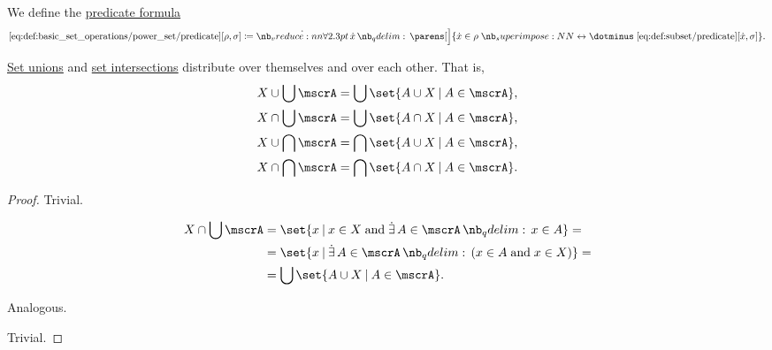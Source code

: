 \begin{definition}
\begin{thmenum}
    We define the \hyperref[con:predicate_formula]{predicate formula}
    \begin{equation*}\taglabel[\op{IsPowerSet}]{eq:def:basic_set_operations/power_set/predicate}
      \ref{eq:def:basic_set_operations/power_set/predicate}[\rho, \sigma] \coloneqq \qforall \synx \parens[\Big]{ \synx \in \rho \syniff \ref{eq:def:subset/predicate}[\synx, \sigma] }.
    \end{equation*}
  \end{thmenum}
\end{definition}

\begin{proposition}\label{thm:union_intersection_distributivity}
  \hyperref[def:basic_set_operations/union]{Set unions} and \hyperref[def:basic_set_operations/intersection]{set intersections} distribute over themselves and over each other. That is,
  \begin{align}
    X \cup \bigcup \mscrA &= \bigcup \set{ A \cup X \given A \in \mscrA }, \label{eq:thm:union_intersection_distributivity/union_over_union} \\
    X \cap \bigcup \mscrA &= \bigcup \set{ A \cap X \given A \in \mscrA }, \label{eq:thm:union_intersection_distributivity/intersection_over_union} \\
    X \cup \bigcap \mscrA &= \bigcap \set{ A \cup X \given A \in \mscrA }, \label{eq:thm:union_intersection_distributivity/union_over_intersection} \\
    X \cap \bigcap \mscrA &= \bigcap \set{ A \cap X \given A \in \mscrA }. \label{eq:thm:union_intersection_distributivity/intersection_over_intersection}
  \end{align}
\end{proposition}
\begin{proof}
   Trivial.

  \begin{align*}
    X \cap \bigcup \mscrA
    &=
    \set{ x \given x \in X \T{and} \qexists{A \in \mscrA} x \in A }
    = \\ &=
    \set{ x \given \qexists{A \in \mscrA} (x \in A \T{and} x \in X) }
    = \\ &=
    \bigcup \set{ A \cup X \given A \in \mscrA }.
  \end{align*}

   Analogous.

   Trivial.
\end{proof}

